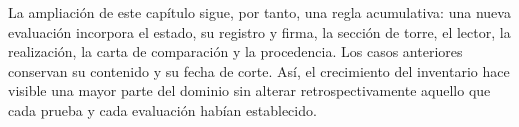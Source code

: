 La ampliación de este capítulo sigue, por tanto, una regla acumulativa:
una nueva evaluación incorpora el estado, su registro y firma, la sección
de torre, el lector, la realización, la carta de comparación y la
procedencia. Los casos anteriores conservan su contenido y su fecha de
corte. Así, el crecimiento del inventario hace visible una mayor parte
del dominio sin alterar retrospectivamente aquello que cada prueba y
cada evaluación habían establecido.
